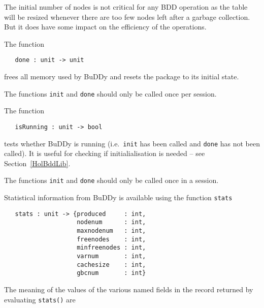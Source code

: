 \documentclass[12pt]{article}
\newcommand{\bnind}[1]{\index[MLbn]{#1}}
\renewcommand{\t}[1]{\mbox{\tt #1}}
\newcommand{\ml}[1]{{\tt #1}}
\newcommand{\Buddy}{BuDDy\xspace}
\begin{document}
The initial number of nodes is not critical for any BDD operation
as the table will be resized whenever there are too few nodes left
after a garbage collection.  But it does have some impact on the
efficiency of the operations.

The function

\begin{verbatim}
   done : unit -> unit
\end{verbatim}\bnind{\ml{done}}

frees all memory used by \Buddy{} and resets the
package to its initial state. 

The functions \t{init} and \t{done} should only be called once per session.

The function

\begin{verbatim}
   isRunning : unit -> bool
\end{verbatim}\bnind{\ml{isRunning}}

tests whether
\Buddy{} is running (i.e.~\t{init} has been called and \t{done} has not been called). It is
useful for checking if initialialisation is needed -- see Section~\ref{HolBddLib}.

The functions \t{init} and \t{done} should only be called once in a session.

Statistical information from \Buddy{} is available
using the function \t{stats}

\begin{verbatim}
   stats : unit -> {produced     : int,
                    nodenum      : int,
                    maxnodenum   : int,
                    freenodes    : int,
                    minfreenodes : int,
                    varnum       : int,
                    cachesize    : int,
                    gbcnum       : int}
\end{verbatim}\bnind{\ml{stats}}

The meaning of the values of the various named fields in the record returned by
evaluating \t{stats()} are

\medskip
\end{document}
